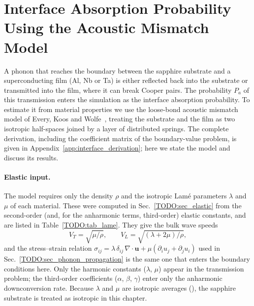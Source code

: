 \section{Interface Absorption Probability Using the Acoustic Mismatch Model}
\label{sec:interface_AMM}

A phonon that reaches the boundary between the sapphire substrate and a superconducting
film (Al, Nb or Ta) is either reflected back into the substrate or transmitted into the film,
where it can break Cooper pairs. The probability $P_a$ of this transmission enters the
simulation as the interface absorption probability. To estimate it from material properties
we use the loose-bond acoustic mismatch model of Every, Koos and
Wolfe~\cite{Every1984}, treating the substrate and the film as two isotropic half-spaces
joined by a layer of distributed springs. The complete derivation, including the coefficient
matrix of the boundary-value problem, is given in Appendix~\ref{app:interface_derivation};
here we state the model and discuss its results.

\paragraph{Elastic input.}
The model requires only the density $\rho$ and the isotropic Lam\'e parameters $\lambda$ and
$\mu$ of each material. These were computed in Sec.~\ref{TODO:sec_elastic} from the
second-order (and, for the anharmonic terms, third-order) elastic constants, and are listed in
Table~\ref{TODO:tab_lame}. They give the bulk wave speeds
\begin{equation}
  V_T=\sqrt{\mu/\rho},\qquad V_L=\sqrt{(\lambda+2\mu)/\rho},
\end{equation}
and the stress--strain relation
$\sigma_{ij}=\lambda\,\delta_{ij}\,\nabla\!\cdot\!\mathbf u+\mu(\partial_iu_j+\partial_ju_i)$
used in Sec.~\ref{TODO:sec_phonon_propagation} is the same one that enters the boundary
conditions here. Only the harmonic constants ($\lambda$, $\mu$) appear in the transmission
problem; the third-order coefficients ($\alpha$, $\beta$, $\gamma$) enter only the anharmonic
downconversion rate. Because $\lambda$ and $\mu$ are isotropic averages
(), the sapphire substrate is treated
as isotropic in this chapter.

